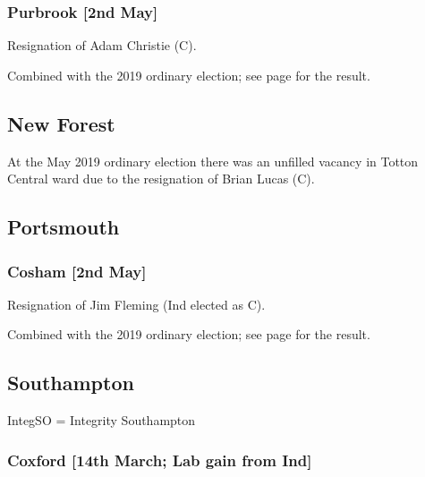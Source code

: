 \documentclass[a4paper,openany]{book}
\begin{document}
\begin{resultsiii}
\subsubsection*{Purbrook \hspace*{\fill}\nolinebreak[1]%
	\enspace\hspace*{\fill}
	[2nd May]}


Resignation of Adam Christie (C).

Combined with the 2019 ordinary election; see page \pageref{HavantPurbrook} for the result.

\subsection*{New Forest}

At the May 2019 ordinary election there was an unfilled vacancy in Totton Central ward due to the resignation of Brian Lucas (C).

\subsection*{Portsmouth}

\subsubsection*{Cosham \hspace*{\fill}\nolinebreak[1]%
	\enspace\hspace*{\fill}
	[2nd May]}


Resignation of Jim Fleming (Ind elected as C).

Combined with the 2019 ordinary election; see page \pageref{PortsmouthCosham} for the result.

\subsection*{Southampton}

IntegSO = Integrity Southampton

\subsubsection*{Coxford \hspace*{\fill}\nolinebreak[1]%
	\enspace\hspace*{\fill}
	[14th March; Lab gain from Ind]}


\end{resultsiii}
\end{document}
